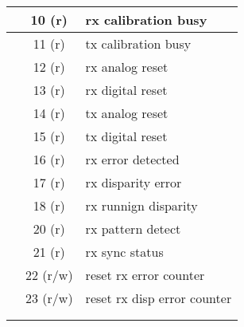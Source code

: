 \documentclass[landscape,margin=3pt,pstricks]{standalone}
\begin{document}
\begin{tabular}{|c|c|*{32}{c|}}
 & 10 (r) &  \multicolumn{32}{|l|}{rx calibration busy} \\ \hline
 & 11 (r) &  \multicolumn{32}{|l|}{tx calibration busy} \\ \hline
 & 12 (r) &  \multicolumn{32}{|l|}{rx analog reset} \\ \hline
 & 13 (r) &  \multicolumn{32}{|l|}{rx digital reset} \\ \hline
 & 14 (r) &  \multicolumn{32}{|l|}{tx analog reset} \\ \hline
 & 15 (r) &  \multicolumn{32}{|l|}{tx digital reset} \\ \hline
 & 16 (r) &  \multicolumn{32}{|l|}{rx error detected} \\ \hline
 & 17 (r) &  \multicolumn{32}{|l|}{rx disparity error} \\ \hline
 & 18 (r) &  \multicolumn{32}{|l|}{rx runnign disparity} \\ \hline
 & 20 (r) &  \multicolumn{32}{|l|}{rx pattern detect} \\ \hline
 & 21 (r) &  \multicolumn{32}{|l|}{rx sync status} \\ \hline
 & 22 (r/w) &  \multicolumn{32}{|l|}{reset rx error counter} \\ \hline
 & 23 (r/w) &  \multicolumn{32}{|l|}{reset rx disp error counter} \\ \hline
 &  &  \multicolumn{32}{|l|}{} \\ \hline
 &  &  \multicolumn{32}{|l|}{} \\ \hline
  \hline
\end{tabular}
\end{document}
